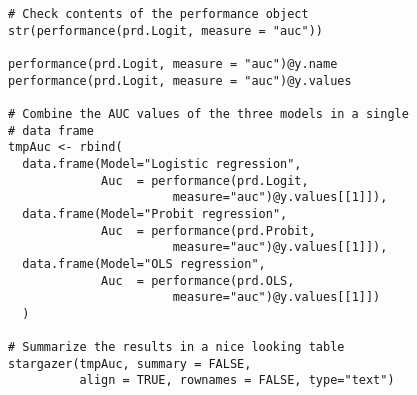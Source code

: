 \documentclass{article}
\begin{document}
\begin{tiny}
\begin{verbatim}
# Check contents of the performance object
str(performance(prd.Logit, measure = "auc"))

performance(prd.Logit, measure = "auc")@y.name
performance(prd.Logit, measure = "auc")@y.values

# Combine the AUC values of the three models in a single
# data frame
tmpAuc <- rbind(
  data.frame(Model="Logistic regression", 
             Auc  = performance(prd.Logit, 
                       measure="auc")@y.values[[1]]),
  data.frame(Model="Probit regression", 
             Auc  = performance(prd.Probit, 
                       measure="auc")@y.values[[1]]),
  data.frame(Model="OLS regression", 
             Auc  = performance(prd.OLS, 
                       measure="auc")@y.values[[1]])
  )

# Summarize the results in a nice looking table
stargazer(tmpAuc, summary = FALSE, 
          align = TRUE, rownames = FALSE, type="text")




\end{verbatim}
\end{tiny}
\end{document}
